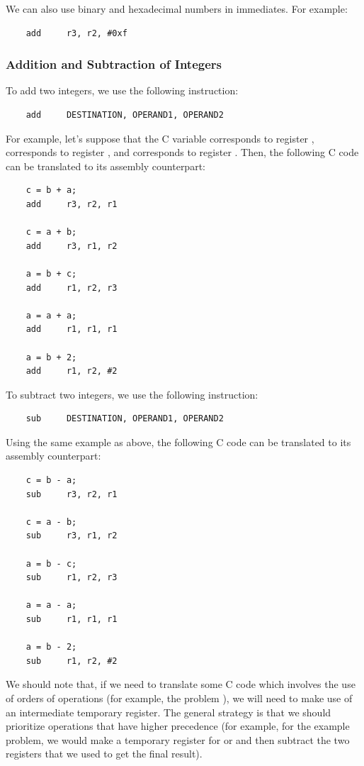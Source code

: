 \documentclass[letterpaper]{article}
\begin{document}
We can also use binary and hexadecimal numbers in immediates. For example:
\begin{verbatim}
    add     r3, r2, #0xf
\end{verbatim}

\subsubsection{Addition and Subtraction of Integers}
To add two integers, we use the following instruction:
\begin{verbatim}
    add     DESTINATION, OPERAND1, OPERAND2
\end{verbatim}
For example, let's suppose that the C variable  corresponds to register ,  corresponds to register , and  corresponds to register . Then, the following C code can be translated to its assembly counterpart:
\begin{verbatim}
    c = b + a;
    add     r3, r2, r1 

    c = a + b;
    add     r3, r1, r2 

    a = b + c; 
    add     r1, r2, r3

    a = a + a;
    add     r1, r1, r1 

    a = b + 2;
    add     r1, r2, #2
\end{verbatim}
To subtract two integers, we use the following instruction: 
\begin{verbatim}
    sub     DESTINATION, OPERAND1, OPERAND2
\end{verbatim}
Using the same example as above, the following C code can be translated to its assembly counterpart:
\begin{verbatim}
    c = b - a;
    sub     r3, r2, r1 

    c = a - b;
    sub     r3, r1, r2 

    a = b - c; 
    sub     r1, r2, r3
    
    a = a - a;
    sub     r1, r1, r1 

    a = b - 2;
    sub     r1, r2, #2
\end{verbatim}
We should note that, if we need to translate some C code which involves the use of orders of operations (for example, the problem ), we will need to make use of an intermediate temporary register. The general strategy is that we should prioritize operations that have higher precedence (for example, for the example problem, we would make a temporary register for  or  and then subtract the two registers that we used to get the final result). 
\end{document}
